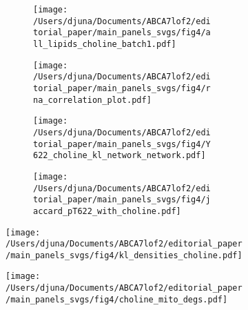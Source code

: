 \documentclass[12pt]{article}
\begin{document}
\begin{figure}[H]
    \begin{subfigure}[t]{.24\textwidth}
        \begin{subfigure}[t]{\textwidth}
            \caption{}
            \texttt{[image: /Users/djuna/Documents/ABCA7lof2/editorial\_paper/main\_panels\_svgs/fig4/all\_lipids\_choline\_batch1.pdf]}        
        \end{subfigure} 
        \begin{subfigure}[t]{\textwidth}
            \caption{}
            \vspace{-0.5cm}
            \centering
            \texttt{[image: /Users/djuna/Documents/ABCA7lof2/editorial\_paper/main\_panels\_svgs/fig4/rna\_correlation\_plot.pdf]}        
        \end{subfigure}  
    \end{subfigure}  
    \hspace{.5cm}
    \begin{subfigure}[t]{.23\textwidth}
        \begin{subfigure}[t]{\textwidth}
            \caption{}
            \texttt{[image: /Users/djuna/Documents/ABCA7lof2/editorial\_paper/main\_panels\_svgs/fig4/Y622\_choline\_kl\_network\_network.pdf]}        
        \end{subfigure}  
        \begin{subfigure}[t]{\textwidth}
            \caption{}
            \texttt{[image: /Users/djuna/Documents/ABCA7lof2/editorial\_paper/main\_panels\_svgs/fig4/jaccard\_pT622\_with\_choline.pdf]}        
        \end{subfigure} 
    \end{subfigure} 
    \hspace{.25cm}
    \begin{subfigure}[t]{.45\textwidth}
        \caption{}
        \texttt{[image: /Users/djuna/Documents/ABCA7lof2/editorial\_paper/main\_panels\_svgs/fig4/kl\_densities\_choline.pdf]}        
    \end{subfigure}  
    \begin{subfigure}[t]{.3\textwidth}
        \caption{}
        \texttt{[image: /Users/djuna/Documents/ABCA7lof2/editorial\_paper/main\_panels\_svgs/fig4/choline\_mito\_degs.pdf]}        
    \end{subfigure}  
    \hspace{.4cm} 

\end{figure}
\end{document}

